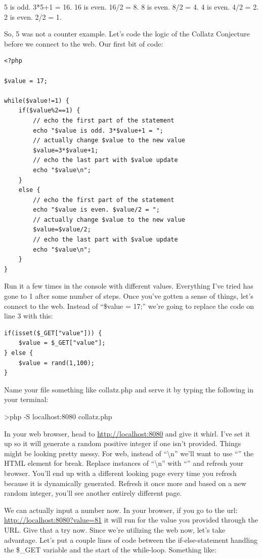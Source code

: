 \documentclass[
]{book}
\begin{document}
5 is odd. 3*5+1 = 16. 16 is even. 16/2 = 8. 8 is even. 8/2 = 4. 4 is even. 4/2 = 2. 2 is even. 2/2 = 1.

So, 5 was not a counter example. Let's code the logic of the Collatz Conjecture before we connect to the web. Our first bit of code:

\begin{verbatim}
<?php

$value = 17;

while($value!=1) {
    if($value%2==1) {
        // echo the first part of the statement
        echo "$value is odd. 3*$value+1 = ";
        // actually change $value to the new value
        $value=3*$value+1;
        // echo the last part with $value update
        echo "$value\n";
    }
    else {
        // echo the first part of the statement
        echo "$value is even. $value/2 = ";
        // actually change $value to the new value
        $value=$value/2;
        // echo the last part with $value update
        echo "$value\n";
    }
}
\end{verbatim}

Run it a few times in the console with different values. Everything I've tried has gone to 1 after some number of steps. Once you've gotten a sense of things, let's connect to the web. Instead of ``\$value = 17;'' we're going to replace the code on line 3 with this:

\begin{verbatim}
if(isset($_GET["value"])) {
    $value = $_GET["value"];
} else {
    $value = rand(1,100);
}
\end{verbatim}

Name your file something like collatz.php and serve it by typing the following in your terminal:

\textgreater php -S localhost:8080 collatz.php

In your web browser, head to \url{http://localhost:8080} and give it whirl. I've set it up so it will generate a random positive integer if one isn't provided. Things might be looking pretty messy. For web, instead of ``\textbackslash n'' we'll want to use ``'' the HTML element for break. Replace instances of ``\textbackslash n'' with ``'' and refresh your browser. You'll end up with a different looking page every time you refresh because it is dynamically generated. Refresh it once more and based on a new random integer, you'll see another entirely different page.

We can actually input a number now. In your browser, if you go to the url: \url{http://localhost:8080?value=81} it will run for the value you provided through the URL. Give that a try now. Since we're utilizing the web now, let's take advantage. Let's put a couple lines of code between the if-else-statement handling the \$\_GET variable and the start of the while-loop. Something like:
\end{document}
